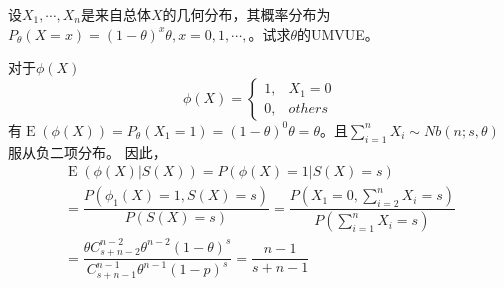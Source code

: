 \begin{example}
    设$X_1,\cdots,X_n$是来自总体$X$的几何分布，其概率分布为$P_{\theta}(X = x) = (1-\theta)^x\theta,x = 0,1,\cdots,$。试求$\theta$的UMVUE。

    对于$\phi(X)$
    \[
        \phi(X) = \left\{
            \begin{array}{ll}
                1, & X_{1} = 0 \\
                0, & others
            \end{array}
        \right.
    \]
    有$\operatorname{E}(\phi(X)) = P_{\theta}(X_1 = 1) = (1-\theta)^0\theta = \theta$。且$\sum_{i = 1}^{n}X_i\sim Nb(n;s,\theta)$服从负二项分布。
    因此，
    \[
        \begin{array}{l}
            \operatorname{E}(\phi(X)|S(X)) = P(\phi(X) = 1|S(X) = s)\\
            =\dfrac{P(\phi_1(X) = 1,S(X) = s)}{P(S(X) = s)} = \dfrac{P(X_1=0,\sum\limits_{i = 2}^{n}X_i = s)}{P(\sum\limits_{i = 1}^{n}X_i = s)}\\
            =\dfrac{\theta C_{s+n-2}^{n-2}\theta^{n-2}(1-\theta)^{s}}{C_{s+n-1}^{n-1}\theta^{n-1}(1-p)^{s}} = \dfrac{n-1}{s+n-1}\\
        \end{array}   
    \]
\end{example}
